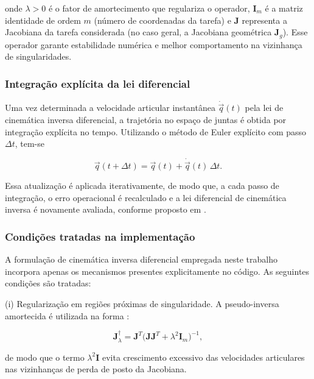 onde $\lambda > 0$ é o fator de amortecimento que regulariza o operador, $\mathbf{I}_{m}$ é a matriz identidade de ordem $m$ (número de coordenadas da tarefa) e $\mathbf{J}$ representa a Jacobiana da tarefa considerada (no caso geral, a Jacobiana geométrica $\mathbf{J}_{g}$). Esse operador garante estabilidade numérica e melhor comportamento na vizinhança de singularidades.


\subsubsection{Integração explícita da lei diferencial}

Uma vez determinada a velocidade articular instantânea $\dot{\vec q}(t)$ pela lei de cinemática inversa diferencial, a trajetória no espaço de juntas é obtida por integração explícita no tempo. Utilizando o método de Euler explícito com passo $\Delta t$, tem-se

\begin{equation}
\label{eq:integracao_explicita_q}
\vec q(t + \Delta t)
=
\vec q(t)
+
\dot{\vec q}(t)\,\Delta t.
\end{equation}

Essa atualização é aplicada iterativamente, de modo que, a cada passo de integração, o erro operacional é recalculado e a lei diferencial de cinemática inversa é novamente avaliada, conforme proposto em \cite{sciavicco_siciliano2010}.

\subsubsection{Condições tratadas na implementação}

A formulação de cinemática inversa diferencial empregada neste trabalho incorpora apenas os mecanismos presentes explicitamente no código.
As seguintes condições são tratadas:

(i) Regularização em regiões próximas de singularidade.  
A pseudo-inversa amortecida é utilizada na forma \cite{sciavicco_siciliano2010}:

\begin{equation}
\mathbf{J}_{\lambda}^{\dagger}
=
\mathbf{J}^{T}
\bigl(
\mathbf{J}\mathbf{J}^{T}
+
\lambda^{2}\mathbf{I}_{m}
\bigr)^{-1},
\end{equation}

de modo que o termo $\lambda^{2}\mathbf{I}$ evita crescimento excessivo das velocidades articulares nas vizinhanças de perda de posto da Jacobiana.

